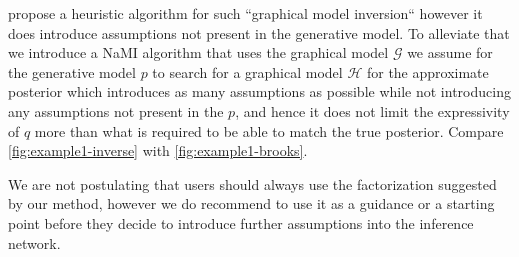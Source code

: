 \documentclass[12pt]{article}
\begin{document}
\citet{StuhlmullerEtAl2013} propose a heuristic algorithm for such ``graphical model inversion`` however it does introduce assumptions not present in the generative model.
To alleviate that we introduce a NaMI algorithm that uses the graphical model $\mathcal{G}$ we assume for the generative model $p$ to search for a graphical model $\mathcal{H}$ for the approximate posterior which introduces as many assumptions as possible while not introducing any assumptions not present in the $p$, and hence it does not limit the expressivity of $q$ more than what is required to be able to match the true posterior. 
Compare \autoref{fig:example1-inverse} with \autoref{fig:example1-brooks}.

We are not postulating that users should always use the factorization suggested by our method,
however we do recommend to use it as a guidance or a starting point before they decide to
introduce further assumptions into the inference network.


\end{document}

